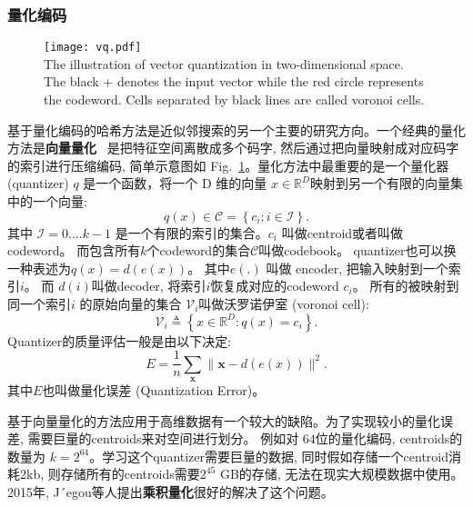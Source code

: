 \subsubsection{量化编码}
\begin{figure}[!htp]
    \centering
    \texttt{[image: vq.pdf]} \\
      {The illustration of vector quantization in two-dimensional space. The black + denotes the input vector while the red circle represents the codeword. Cells separated by black lines are called voronoi cells. }
   \label{fig:vectorquant}
\end{figure}
基于量化编码的哈希方法是近似邻搜索的另一个主要的研究方向。一个经典的量化方法是\textbf{向量量化} ~\cite{gray1984vector}是把特征空间离散成多个码字, 然后通过把向量映射成对应码字的索引进行压缩编码, 简单示意图如 Fig.~\ref{fig:vectorquant}。量化方法中最重要的是一个量化器 (quantizer)  $q$ 是一个函数，将一个 D 维的向量 $x \in \mathbb{R}^D$映射到另一个有限的向量集中的一个向量:
\begin{equation}
    q(x) \in \mathcal{C} = \left \{ c_i; i \in  \mathcal{I}\right\}.
    \label{eq:vector}
\end{equation}
其中 $\mathcal{I} = 0 .... k-1$ 是一个有限的索引的集合。$c_i$ 叫做centroid或者叫做codeword。  而包含所有$k$个codeword的集合$\mathcal{C}$叫做codebook。 quantizer也可以换一种表述为$q(x) = d(e(x))$。 其中$e(.)$ 叫做 encoder, 把输入映射到一个索引$i$。 而 $d(i)$叫做decoder, 将索引$i$恢复成对应的codeword $c_i$。 所有的被映射到同一个索引$i$ 的原始向量的集合 $\mathcal{V}_i$叫做沃罗诺伊室 (voronoi cell):
\begin{equation}
    \mathcal{V}_i \triangleq\left\{x \in \mathbb{R}^D: q(x)=c_i\right\}.
\end{equation}
Quantizer的质量评估一般是由以下决定:
\begin{equation}
    E=\frac{1}{n} \sum_{\mathbf{x}}\|\mathbf{x}- d(e(x))\|^2.
\end{equation}
其中$E$也叫做量化误差 (Quantization Error)。\par
基于向量量化的方法应用于高维数据有一个较大的缺陷。为了实现较小的量化误差, 需要巨量的centroids来对空间进行划分。 例如对 $64$位的量化编码, centroids的数量为 $k = 2^{64}$。学习这个quantizer需要巨量的数据, 同时假如存储一个centroid消耗2kb, 则存储所有的centroids需要$2^{45}$ GB的存储, 无法在现实大规模数据中使用。 2015年, J´egou等人提出\textbf{乘积量化}很好的解决了这个问题。\par
